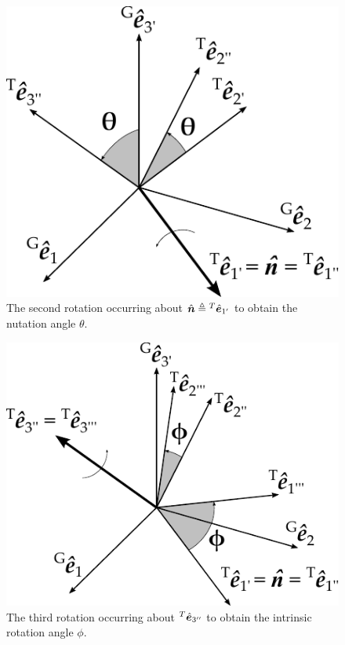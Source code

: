 \begin{appendices}
\begin{figure}[ht]
    \centering
    \includegraphics{img/XX_appendices/xx_03b.pdf}
    \caption{The second rotation occurring about $\hat{\bm{n}} \triangleq {^T}{}\hat{\bm{e}}_{1'}$ to obtain the nutation angle $\theta$.}
    \label{fig:euler_second_rotation}
\end{figure}

\begin{figure}[ht]
    \centering
    \includegraphics{img/XX_appendices/xx_03c.pdf}
    \caption{The third rotation occurring about ${^T}{}\hat{\bm{e}}_{3''}$ to obtain the intrinsic rotation angle $\phi$.}
    \label{fig:euler_third_rotation}
\end{figure}


\end{appendices}
